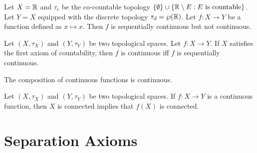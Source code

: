 \documentclass{techreport}
\begin{document}
\begin{example}\label{Exa:SeqContNotCont}
	Let $X = \mathbb{R}$ and $\tau_c$ be the co-countable topology $\{ \emptyset \} \cup \{ \mathbb{R} \setminus E : E~\text{is countable} \}$.
	Let $Y = X$ equipped with the discrete topology $\tau_d = \wp(\mathbb{R})$.
	Let $f : X \to Y$ be a function defined as $x \mapsto x$.
	Then $f$ is sequentially continuous but not continuous.
\end{example}

\begin{proposition}\label{Prop:FstAxCountContIffSeqCont}
	Let $(X,\tau_X)$ and $(Y,\tau_Y)$ be two topological spaces.
	Let $f : X\to Y$.
	If $X$ satisfies the first axiom of countability, then $f$ is continuous iff $f$ is sequentially continuous.
\end{proposition}

\begin{proposition}\label{Prop:ContCompIsCont}
	The composition of continuous functions is continuous.
\end{proposition}

\begin{proposition}\label{Prop:ContPreserveConn}
	Let $(X,\tau_X)$ and $(Y,\tau_Y)$ be two topological spaces.
	If $f : X \to Y$ is a continuous function, then $X$ is connected implies that $f(X)$ is connected.
\end{proposition}

\section{Separation Axioms}
\end{document}
